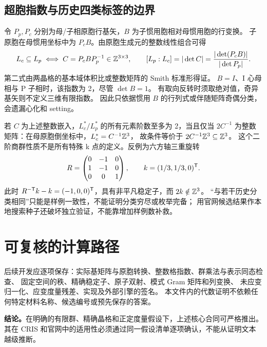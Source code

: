 \subsection{超胞指数与历史四类标签的边界}
令 $P_p,P_c$ 分别为母/子相原胞行基矢，$B$ 为子惯用胞相对母惯用胞的行变换。
子原胞在母惯用坐标中为 $P_cB$。由原胞生成元的整数线性组合可得
\[
 L_c\subseteq L_p\iff C=P_cBP_p^{-1}\in\mathbb Z^{3\times3},\qquad
 [L_p:L_c]=|\det C|=\frac{|\det(P_cB)|}{|\det P_p|}.
\]
第二式由两晶格的基本域体积比或整数矩阵的 Smith 标准形得证。
$B=I$、I 心母相与 P 子相时，该指数为 2，尽管 $\det B=1$。
有取向反转时须取绝对值，奇异基矢则不定义三维有限指数。
因此只依据惯用 $B$ 的行列式或伴随矩阵奇偶分类，会遗漏心化和 setting。

若 $C$ 为上述整数嵌入，$L_c^*/L_p^*$ 的所有元素阶数至多为 2，当且仅当
$2C^{-1}$ 为整数矩阵：在母原胞倒坐标中，$L_c^*=C^{-1}\mathbb Z^3$，
故条件等价于 $2C^{-1}\mathbb Z^3\subseteq\mathbb Z^3$。
这个二阶商群性质不是所有特殊 k 点的定义。反例为六方轴三重旋转
\[
 R=\begin{pmatrix}0&-1&0\\1&-1&0\\0&0&1\end{pmatrix},\qquad
 k=(1/3,1/3,0)^\mathsf T.
\]
此时 $R^{-\mathsf T}k-k=(-1,0,0)^\mathsf T$，具有非平凡稳定子，而 $2k\notin\mathbb Z^3$。
“与若干历史分类相同”只能是样例一致性，不能证明分类穷尽或枚举完备；
用官网候选结果作本地搜索种子还破坏独立验证，不能靠增加样例数补救。

\section{可复核的计算路径}
后续开发应逐项保存：实际基矩阵与原胞转换、整数格指数、群乘法与表示同态检查、
固定空间的秩、精确稳定子、原子双射、模式 Gram 矩阵和列变换、
未应变归一化、应变度量残差、实现及外部引擎的签名。
本文件内的代数证明不依赖任何特定材料名称、候选编号或预先保存的答案。
\par\textbf{结论。}在明确的有限群、精确晶格和正定度量假设下，上述核心合同可严格推出。
其在 CRIS 和官网中的适用性必须通过同一假设清单逐项确认，不能从证明文本越级推断。




